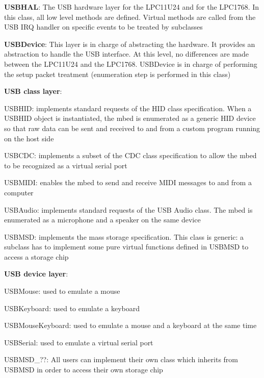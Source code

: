 \documentclass[pdftex,10pt,a4paper]{report}
\newenvironment{packed_item}{
\begin{itemize}
  \setlength{\itemsep}{1pt}
  \setlength{\parskip}{0pt}
  \setlength{\parsep}{0pt}
}{\end{itemize}}
\begin{document}
\begin{packed_item}

	\item \textbf{USBHAL}: The USB hardware layer for the LPC11U24 and for the LPC1768. In this class, all low level methods are defined. Virtual methods are called from the USB IRQ handler on specific events to be treated by subclasses

	\item \textbf{USBDevice}: This layer is in charge of abstracting the hardware. It provides an abstraction to handle the USB interface. At this level, no differences are made between the LPC11U24 and the LPC1768. USBDevice is in charge of performing the setup packet treatment (enumeration step is performed in this class)

	\item \textbf{USB class layer}:
		\begin{packed_item}
			\item USBHID: implements standard requests of the HID class specification. When a USBHID object is instantiated, the mbed is enumerated as a generic HID device so that raw data can be sent and received to and from a custom program running on the host side
			\item USBCDC: implements a subset of the CDC class specification to allow the mbed to be recognized as a virtual serial port
			\item USBMIDI: enables the mbed to send and receive MIDI messages to and from a computer
			\item USBAudio: implements standard requests of the USB Audio class. The mbed is enumerated as a microphone and a speaker on the same device
			\item USBMSD: implements the mass storage specification. This class is generic: a subclass has to implement some pure virtual functions defined in USBMSD to access a storage chip
		\end{packed_item}
		
	\item \textbf{USB device layer}:
		\begin{packed_item}
			\item USBMouse: used to emulate a mouse
			\item USBKeyboard: used to emulate a keyboard
			\item USBMouseKeyboard: used to emulate a mouse and a keyboard at the same time
			\item USBSerial: used to emulate a virtual serial port
			\item USBMSD\_??: All users can implement their own class which inherits from USBMSD in order to access their own storage chip
		\end{packed_item}
	
\end{packed_item}
\end{document}
